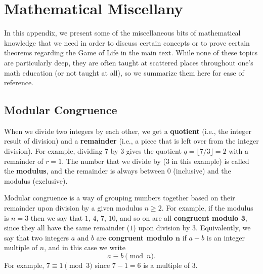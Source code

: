 
\renewcommand{\chapterfolder}{appendices/}

\chapter{Mathematical Miscellany}\label{app:math}

In this appendix, we present some of the miscellaneous bits of mathematical knowledge that we need in order to discuss certain concepts or to prove certain theorems regarding the Game of Life in the main text. While none of these topics are particularly deep, they are often taught at scattered places throughout one's math education (or not taught at all), so we summarize them here for ease of reference.


\section{Modular Congruence}\label{sec:modular_arithmetic}

When we divide two integers by each other, we get a \textbf{quotient} (i.e., the integer result of division) and a \textbf{remainder} (i.e., a piece that is left over from the integer division). For example, dividing $7$ by $3$ gives the quotient $q = \lfloor 7/3 \rfloor = 2$ with a remainder of $r = 1$. The number that we divide by ($3$ in this example) is called the \textbf{modulus}, and the remainder is always between $0$ (inclusive) and the modulus (exclusive).

Modular congruence is a way of grouping numbers together based on their remainder upon division by a given modulus $n \geq 2$. For example, if the modulus is $n = 3$ then we say that $1$, $4$, $7$, $10$, and so on are all \textbf{congruent modulo $\mathbf{3}$}, since they all have the same remainder ($1$) upon division by $3$. Equivalently, we say that two integers $a$ and $b$ are \textbf{congruent modulo $\mathbf{n}$} if $a-b$ is an integer multiple of $n$, and in this case we write
\[
	a \equiv b \pmod{n}.
\]
For example, $7 \equiv 1 \pmod{3}$ since $7 - 1 = 6$ is a multiple of $3$.


